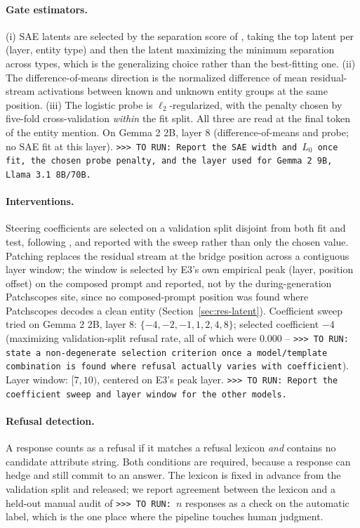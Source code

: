 \documentclass{article}
\newcommand{\TORUN}[1]{{\color{blue}\texttt{>{}>{}> TO RUN: #1}}}
\begin{document}
\paragraph{Gate estimators.} (i) SAE latents are selected by the separation score of
\citet{ferrando2025entity}, taking the top latent per (layer, entity type) and then the latent
maximizing the minimum separation across types, which is the generalizing choice rather than the
best-fitting one. (ii) The difference-of-means direction is the normalized difference of mean
residual-stream activations between known and unknown entity groups at the same position.
(iii) The logistic probe is $\ell_2$-regularized, with the penalty chosen by five-fold
cross-validation \emph{within} the fit split. All three are read at the final token of the entity
mention. On Gemma 2 2B, layer 8 (difference-of-means and probe; no SAE fit at this layer). \TORUN{Report the SAE width and $L_0$ once fit, the chosen probe penalty, and the layer used for
Gemma 2 9B, Llama 3.1 8B/70B.}

\paragraph{Interventions.} Steering coefficients are selected on a validation split disjoint from
both fit and test, following \citet{ferrando2025entity}, and reported with the sweep rather than only
the chosen value. Patching replaces the residual stream at the bridge position across a contiguous
layer window; the window is selected by E3's own empirical peak (layer, position offset) on the
composed prompt and reported, not by the during-generation Patchscopes site, since no composed-prompt
position was found where Patchscopes decodes a clean entity (Section~\ref{sec:res-latent}).
Coefficient sweep tried on Gemma 2 2B, layer 8: $\{-4,-2,-1,1,2,4,8\}$; selected coefficient
$-4$ (maximizing validation-split refusal rate, all of which were $0.000$ -- \TORUN{state a
non-degenerate selection criterion once a model/template combination is found where refusal actually
varies with coefficient}). Layer window: $[7,10)$, centered on E3's peak layer.
\TORUN{Report the coefficient sweep and layer window for the other models.}

\paragraph{Refusal detection.} A response counts as a refusal if it matches a refusal lexicon
\emph{and} contains no candidate attribute string. Both conditions are required, because a response
can hedge and still commit to an answer. The lexicon is fixed in advance from the validation split
and released; we report agreement between the lexicon and a held-out manual audit of
\TORUN{$n$} responses as a check on the automatic label, which is the one place where the pipeline
touches human judgment.
\end{document}
